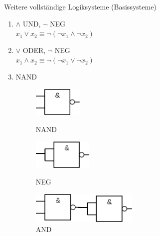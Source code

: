 Weitere vollständige Logiksysteme (Basissysteme)
\begin{enumerate}
	\item $\land$ UND, $\neg$ NEG\\
	$x_1\lor x_2\equiv \neg(\neg x_1\land \neg x_2)$
	
	\item $\lor$ ODER, $\neg$ NEG\\
	$x_1\land x_2\equiv \neg(\neg x_1\lor \neg x_2)$
	
	\item NAND
	\begin{figure}[h!]
		\begin{minipage}{0.32\linewidth}
			\centering \includegraphics[height=1.4cm]{Bilder/46}
			\caption{NAND}
		\end{minipage}
		\begin{minipage}{0.32\linewidth}
			\centering \includegraphics[height=1.4cm]{Bilder/72}
			\caption{NEG}
		\end{minipage}
		\begin{minipage}{0.32\linewidth}
			\centering \includegraphics[height=1.5cm]{Bilder/73}
			\caption{AND}
		\end{minipage}
	\end{figure}


\end{enumerate}
